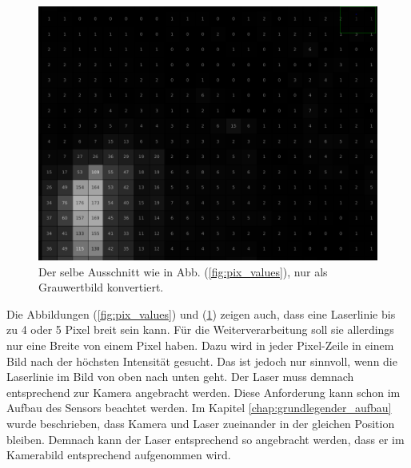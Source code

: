 	\begin{figure}[h]
		\centering
		\includegraphics[width=0.75\linewidth]{img/hauptteil/bildverarbeitung/pixel_values_gray.png}
		\caption[Pixel-Werte im Grauwertbild]{Der selbe Ausschnitt wie in Abb. (\ref{fig:pix_values}), nur als Grauwertbild konvertiert.}
		\label{fig:pix_values_gray}
	\end{figure} 
	
	Die Abbildungen (\ref{fig:pix_values}) und (\ref{fig:pix_values_gray}) zeigen auch, dass eine Laserlinie bis zu 4 oder 5 Pixel breit sein kann. Für die Weiterverarbeitung soll sie allerdings nur eine Breite von einem Pixel haben. Dazu wird in jeder Pixel-Zeile in einem Bild nach der höchsten Intensität gesucht. Das ist jedoch nur sinnvoll, wenn die Laserlinie im Bild von oben nach unten geht. Der Laser muss demnach entsprechend zur Kamera angebracht werden. Diese Anforderung kann schon im Aufbau des Sensors beachtet werden. Im Kapitel \ref{chap:grundlegender_aufbau} wurde beschrieben, dass Kamera und Laser zueinander in der gleichen Position bleiben. Demnach kann der Laser entsprechend so angebracht werden, dass er im Kamerabild entsprechend aufgenommen wird.
	
